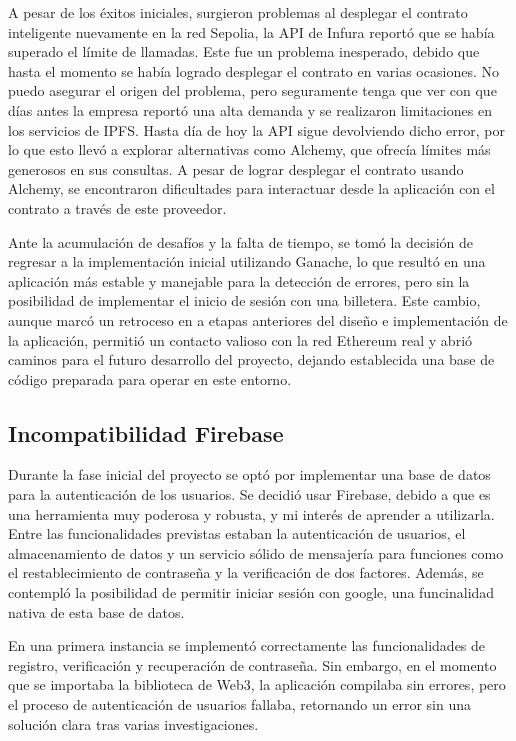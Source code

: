 A pesar de los éxitos iniciales, surgieron problemas al desplegar el contrato inteligente nuevamente en la red Sepolia, la API de Infura reportó que se había superado el límite de llamadas. 
Este fue un problema inesperado, debido que hasta el momento se había logrado desplegar el contrato en varias ocasiones. 
No puedo asegurar el origen del problema, pero seguramente tenga que ver con que días antes la empresa reportó una alta demanda y se realizaron limitaciones en los servicios de IPFS. 
Hasta día de hoy la API sigue devolviendo dicho error, por lo que esto llevó a explorar alternativas como Alchemy, que ofrecía límites más generosos en sus consultas. 
A pesar de lograr desplegar el contrato usando Alchemy, se encontraron dificultades para interactuar desde la aplicación con el contrato a través de este proveedor.

Ante la acumulación de desafíos y la falta de tiempo, se tomó la decisión de regresar a la implementación inicial utilizando Ganache, lo que resultó en una aplicación más estable y manejable para la detección de errores, pero sin la posibilidad de implementar el inicio de sesión con una billetera. Este cambio, aunque marcó un retroceso en a etapas anteriores del diseño e implementación de la aplicación, permitió un contacto valioso con la red Ethereum real y abrió caminos para el futuro desarrollo del proyecto, dejando establecida una base de código preparada para operar en este entorno.



\subsection{Incompatibilidad Firebase}

Durante la fase inicial del proyecto se optó por implementar una base de datos para la autenticación de los usuarios.
Se decidió usar Firebase, debido a que es una herramienta muy poderosa y robusta, y mi interés de aprender a utilizarla. Entre las funcionalidades previstas estaban la autenticación de usuarios, el almacenamiento de datos y un servicio sólido de mensajería para funciones como el restablecimiento de contraseña y la verificación de dos factores.
Además, se contempló la posibilidad de permitir iniciar sesión con google, una funcinalidad nativa de esta base de datos.

En una primera instancia se implementó correctamente las funcionalidades de registro, verificación y recuperación de contraseña.
Sin embargo, en el momento que se importaba la biblioteca de Web3, la aplicación compilaba sin errores, pero el proceso de autenticación de usuarios fallaba, retornando un error sin una solución clara tras varias investigaciones.

